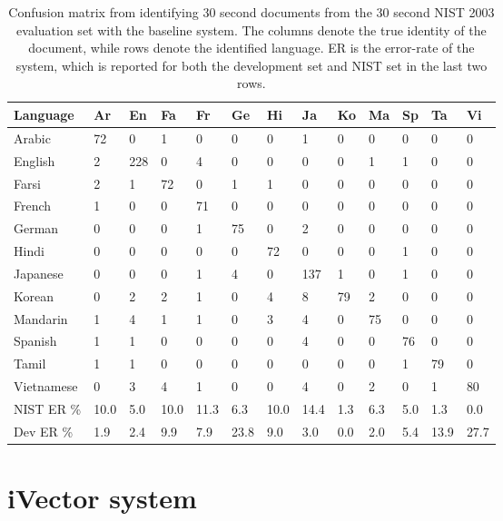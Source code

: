 \begin{table}[hbt!]
\begin{tabular}{| l | p{4.5mm} | p{4.5mm} | p{4.5mm} | p{4.5mm} | p{4.5mm} | p{4.5mm} | p{4.5mm} | p{4.5mm} | p{4.5mm} | p{4.5mm} | p{4.5mm} | p{4.5mm} |}
\hline
Language &Ar & En & Fa & Fr & Ge & Hi & Ja & Ko & Ma & Sp & Ta & Vi \\
\hline
Arabic       & 72 & 0 & 1 & 0 & 0 & 0 & 1 & 0 & 0 & 0 & 0 & 0 \\
English       & 2 & 228 & 0 & 4 & 0 & 0 & 0 & 0 & 1 & 1 & 0 & 0 \\
Farsi          & 2 & 1 & 72 & 0 & 1 & 1 & 0 & 0 & 0 & 0 & 0 & 0 \\
French       & 1 & 0 & 0 & 71 & 0 & 0 & 0 & 0 & 0 & 0 & 0 & 0 \\
German      & 0 & 0 & 0 & 1 & 75 & 0 & 2 & 0 & 0 & 0 & 0 & 0 \\
Hindi          & 0 & 0 & 0 & 0 & 0 & 72 & 0 & 0 & 0 & 1 & 0 & 0 \\
Japanese   & 0 & 0 & 0 & 1 & 4 & 0 & 137 & 1 & 0 & 1 & 0 & 0 \\
Korean       & 0 & 2 & 2 & 1 & 0 & 4 & 8 & 79 & 2 & 0 & 0 & 0 \\
Mandarin    & 1 & 4 & 1 & 1 & 0 & 3 & 4 &  0 & 75 & 0 & 0 & 0 \\
Spanish       & 1 & 1 & 0 & 0 &  0 & 0 & 4 & 0 & 0 & 76 & 0 & 0 \\
Tamil           & 1 & 1 & 0 & 0 & 0 & 0 & 0 & 0 & 0 & 1 & 79 & 0 \\
Vietnamese & 0 & 3 & 4 & 1 & 0 & 0 & 4 & 0 & 2 & 0 & 1  & 80 \\
\hline
NIST ER \% & 10.0 & 5.0 & 10.0 & 11.3 & 6.3 & 10.0 & 14.4 & 1.3 & 6.3 & 5.0 & 1.3 & 0.0 \\
\hline
Dev ER \% & 1.9 & 2.4 & 9.9 & 7.9 & 23.8 & 9.0 & 3.0 & 0.0 & 2.0 & 5.4 & 13.9 & 27.7 \\
\hline
\end{tabular}
\caption{Confusion matrix from identifying 30 second documents from the 30 second NIST 2003 evaluation set with the baseline system. The columns denote the true identity of the document, while rows denote the identified language. ER is the error-rate of the system, which is reported for both the development set and NIST set in the last two rows.}
\label{baseidresults}
\end{table}

\section{iVector system}

